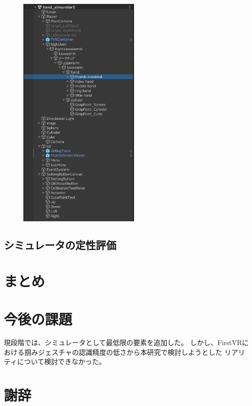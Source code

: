 \documentclass{ltjsreport}
\begin{document}
		\begin{figure}[H]
		\centering
		\includegraphics[width = 6cm]{../figs/UnityObject.png}
		\caption{}
		\label{}
		\end{figure}

	\section{シミュレータの定性評価}
\chapter{まとめ}

\chapter{今後の課題}
	現段階では、シミュレータとして最低限の要素を追加した。
	しかし、FirstVRにおける掴みジェスチャの認識精度の低さから本研究で検討しようとした
	リアリティについて検討できなかった。
\clearpage

\chapter*{謝辞}
\end{document}

